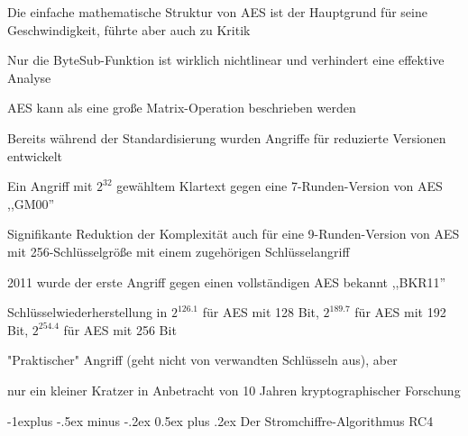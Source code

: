 \documentclass[a4paper]{article}
\makeatletter
\renewcommand{\subsection}{\@startsection{subsection}{2}{0mm}%
 {-1explus -.5ex minus -.2ex}%
 {0.5ex plus .2ex}%
 {\normalfont\normalsize\bfseries}}
\makeatother
\begin{document}
\begin{multicols}{3}
      \begin{itemize*}
            \item Die einfache mathematische Struktur von AES ist der Hauptgrund für
            seine Geschwindigkeit, führte aber auch zu Kritik
            \item Nur die ByteSub-Funktion ist wirklich nichtlinear und verhindert eine
            effektive Analyse
            \item AES kann als eine große Matrix-Operation beschrieben werden
            \item Bereits während der Standardisierung wurden Angriffe für reduzierte
            Versionen entwickelt
            \begin{itemize*}
                  \item Ein Angriff mit $2^{32}$ gewähltem Klartext gegen eine 7-Runden-Version von AES ,,GM00''
                  \item Signifikante Reduktion der Komplexität auch für eine 9-Runden-Version von AES mit 256-Schlüsselgröße mit einem zugehörigen Schlüsselangriff
            \end{itemize*}
            \item 2011 wurde der erste Angriff gegen einen vollständigen AES bekannt
            ,,BKR11''
            \begin{itemize*}
                  \item Schlüsselwiederherstellung in $2^{126.1}$ für AES mit 128 Bit, $2^{189.7}$ für AES mit 192 Bit, $2^{254.4}$ für AES mit 256 Bit
                  \item "Praktischer" Angriff (geht nicht von verwandten Schlüsseln aus), aber
                  \item nur ein kleiner Kratzer in Anbetracht von 10 Jahren kryptographischer Forschung
            \end{itemize*}
      \end{itemize*}


      \subsection{Der Stromchiffre-Algorithmus
            RC4}


\end{multicols}
\end{document}
